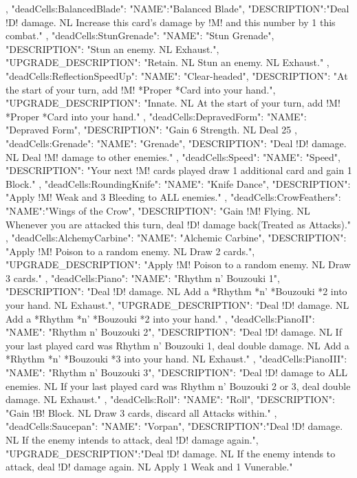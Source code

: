 {{  },
  "deadCells:BalancedBlade": {
    "NAME":"Balanced Blade",
    "DESCRIPTION":"Deal !D! damage. NL Increase this card's damage by !M! and this number by 1 this combat."
  },
  "deadCells:StunGrenade": {
    "NAME": "Stun Grenade",
    "DESCRIPTION": "Stun an enemy. NL Exhaust.",
    "UPGRADE_DESCRIPTION": "Retain. NL Stun an enemy. NL Exhaust."
  },
  "deadCells:ReflectionSpeedUp": {
    "NAME": "Clear-headed",
    "DESCRIPTION": "At the start of your turn, add !M! *Proper *Card into your hand.",
    "UPGRADE_DESCRIPTION": "Innate. NL At the start of your turn, add !M! *Proper *Card into your hand."
  },
  "deadCells:DepravedForm": {
    "NAME": "Depraved Form",
    "DESCRIPTION": "Gain 6 Strength. NL Deal 25%
  },
  "deadCells:Grenade": {
    "NAME": "Grenade",
    "DESCRIPTION": "Deal !D! damage. NL Deal !M! damage to other enemies."
  },
  "deadCells:Speed": {
    "NAME": "Speed",
    "DESCRIPTION": "Your next !M! cards played draw 1 additional card and gain 1 Block."
  },
  "deadCells:RoundingKnife": {
    "NAME": "Knife Dance",
    "DESCRIPTION": "Apply !M! Weak and 3 Bleeding to ALL enemies."
  },
  "deadCells:CrowFeathers": {
    "NAME":"Wings of the Crow",
    "DESCRIPTION": "Gain !M! Flying. NL Whenever you are attacked this turn, deal !D! damage back(Treated as Attacks)."
  },
  "deadCells:AlchemyCarbine": {
    "NAME": "Alchemic Carbine",
    "DESCRIPTION": "Apply !M! Poison to a random enemy. NL Draw 2 cards.",
    "UPGRADE_DESCRIPTION": "Apply !M! Poison to a random enemy. NL Draw 3 cards."
  },
  "deadCells:Piano": {
    "NAME": "Rhythm n' Bouzouki 1",
    "DESCRIPTION": "Deal !D! damage. NL Add a *Rhythm *n' *Bouzouki *2 into your hand. NL Exhaust.",
    "UPGRADE_DESCRIPTION": "Deal !D! damage. NL Add a *Rhythm *n' *Bouzouki *2 into your hand."
  },
  "deadCells:PianoII": {
    "NAME": "Rhythm n' Bouzouki 2",
    "DESCRIPTION": "Deal !D! damage. NL If your last played card was Rhythm n' Bouzouki 1, deal double damage. NL Add a *Rhythm *n' *Bouzouki *3 into your hand. NL Exhaust."
  },
  "deadCells:PianoIII": {
    "NAME": "Rhythm n' Bouzouki 3",
    "DESCRIPTION": "Deal !D! damage to ALL enemies. NL If your last played card was Rhythm n' Bouzouki 2 or 3, deal double damage. NL Exhaust."
  },
  "deadCells:Roll": {
    "NAME": "Roll",
    "DESCRIPTION": "Gain !B! Block. NL Draw 3 cards, discard all Attacks within."
  },
  "deadCells:Saucepan": {
    "NAME": "Vorpan",
    "DESCRIPTION":"Deal !D! damage. NL If the enemy intends to attack, deal !D! damage again.",
    "UPGRADE_DESCRIPTION":"Deal !D! damage. NL If the enemy intends to attack, deal !D! damage again. NL Apply 1 Weak and 1 Vunerable."
}}
